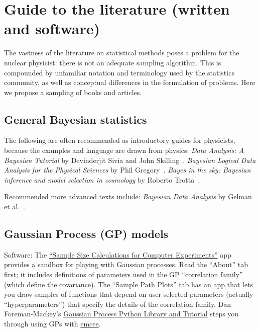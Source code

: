 \section{Guide to the literature (written and software)}  \label{sec:literature}

\bi
  \I The vastness of the literature on statistical methods poses a problem for the
      nuclear physicist: there is not an adequate sampling algorithm.  This is compounded
      by unfamiliar notation and terminology used by the statistics community, as well
      as conceptual differences in the formulation of problems.
  \I Here we propose a sampling of books and articles.
\ei


\subsection{General Bayesian statistics} \label{subsec:gen_bayesian_lit}

The following are often recommended as introductory guides for
physicists, because the examples and language are drawn from physics:
\bi
  \I \textit{Data Analysis: A Bayesian Tutorial} by Devinderjit Sivia and John Skilling~\cite{Sivia:2006}.
  \I \textit{Bayesian Logical Data Analysis for the Physical Sciences} by Phil Gregory~\cite{Gregory:2005}.
  \I \textit{Bayes in the sky: Bayesian inference and model selection in cosmology}
   by Roberto Trotta~\cite{Trotta:2008qt}.
\ei

Recommended more advanced texts include:
\bi
  \I \textit{Bayesian Data Analysis} by Gelman et al.~\cite{Gelman03}.
\ei


\subsection{Gaussian Process (GP) models} \label{subsec:GP_lit}

Software:
\bi
 \I
     The \href{https://harario.shinyapps.io/Sample_Size_Shiny/}{``Sample Size Calculations for Computer Experiments''} app provides a sandbox for playing with
     Gaussian processes.  Read the ``About'' tab first; it includes definitions
     of parameters used in the GP ``correlation family'' (which define the covariance).
     The ``Sample Path Plots'' tab has an app that lets you draw samples of functions
     that depend on user selected parameters (actually ``hyperparameters'') that specify 
     the details of the correlation family.  
 \I Dan Foreman-Mackey's \href{http://dan.iel.fm/george/current/user/model/}{Gaussian Process Python 
     Library and Tutorial} steps you through using GPs with \href{http://dan.iel.fm/emcee/}{emcee}.
\ei 

